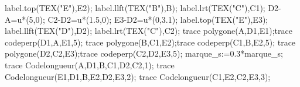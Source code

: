 \begin{corrige}
\begin{enumerate}
\begin{Geometrie}
            label.top(TEX("E"),E2);
            label.llft(TEX("B"),B);
            label.lrt(TEX("C"),C1);
            D2-A=u*(5,0);
            C2-D2=u*(1.5,0);
            E3-D2=u*(0,3.1);
            label.top(TEX("E"),E3);
            label.llft(TEX("D"),D2);
            label.lrt(TEX("C"),C2);
            trace polygone(A,D1,E1);trace codeperp(D1,A,E1,5);
            trace polygone(B,C1,E2);trace codeperp(C1,B,E2,5);
            trace polygone(D2,C2,E3);trace codeperp(C2,D2,E3,5);
            marque_s:=0.3*marque_s;
            trace Codelongueur(A,D1,B,C1,D2,C2,1);
            trace Codelongueur(E1,D1,B,E2,D2,E3,2);
            trace Codelongueur(C1,E2,C2,E3,3);
        \end{Geometrie}
    \end{enumerate}
\end{corrige}

